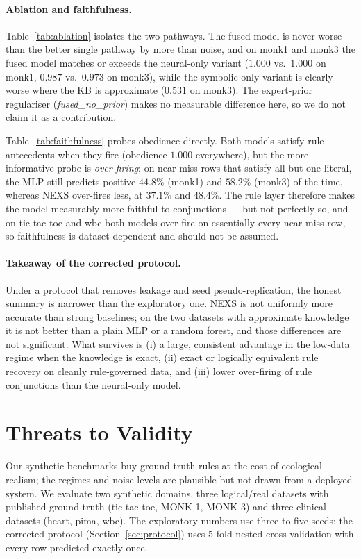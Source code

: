 \documentclass[11pt]{article}
\newcommand{\nexs}{\textsc{NEXS}}
\begin{document}


\paragraph{Ablation and faithfulness.}
Table~\ref{tab:ablation} isolates the two pathways. The fused model is never worse
than the better single pathway by more than noise, and on monk1 and monk3 the
fused model matches or exceeds the neural-only variant ($1.000$ vs.\ $1.000$ on
monk1, $0.987$ vs.\ $0.973$ on monk3), while the symbolic-only variant is clearly
worse where the KB is approximate ($0.531$ on monk3). The expert-prior regulariser
(\emph{fused\_no\_prior}) makes no measurable difference here, so we do not claim
it as a contribution.

Table~\ref{tab:faithfulness} probes obedience directly. Both models satisfy rule
antecedents when they fire (obedience $1.000$ everywhere), but the more
informative probe is \emph{over-firing}: on near-miss rows that satisfy all but
one literal, the MLP still predicts positive $44.8\%$ (monk1) and $58.2\%$
(monk3) of the time, whereas \nexs{} over-fires less, at $37.1\%$ and $48.4\%$.
The rule layer therefore makes the model measurably more faithful to conjunctions
--- but not perfectly so, and on tic-tac-toe and wbc both models over-fire on
essentially every near-miss row, so faithfulness is dataset-dependent and should
not be assumed.




\paragraph{Takeaway of the corrected protocol.}
Under a protocol that removes leakage and seed pseudo-replication, the honest
summary is narrower than the exploratory one. \nexs{} is not uniformly more
accurate than strong baselines; on the two datasets with approximate knowledge it
is not better than a plain MLP or a random forest, and those differences are not
significant. What survives is (i) a large, consistent advantage in the low-data
regime when the knowledge is exact, (ii) exact or logically equivalent rule
recovery on cleanly rule-governed data, and (iii) lower over-firing of rule
conjunctions than the neural-only model.

\section{Threats to Validity}
\label{sec:threats}
Our synthetic benchmarks buy ground-truth rules at the cost of ecological
realism; the regimes and noise levels are plausible but not drawn from a deployed
system. We evaluate two synthetic domains, three logical/real datasets with
published ground truth (tic-tac-toe, MONK-1, MONK-3) and three clinical datasets
(heart, pima, wbc). The exploratory numbers use three to five seeds; the corrected
protocol (Section~\ref{sec:protocol}) uses $5$-fold nested cross-validation with
every row predicted exactly once.
\end{document}
